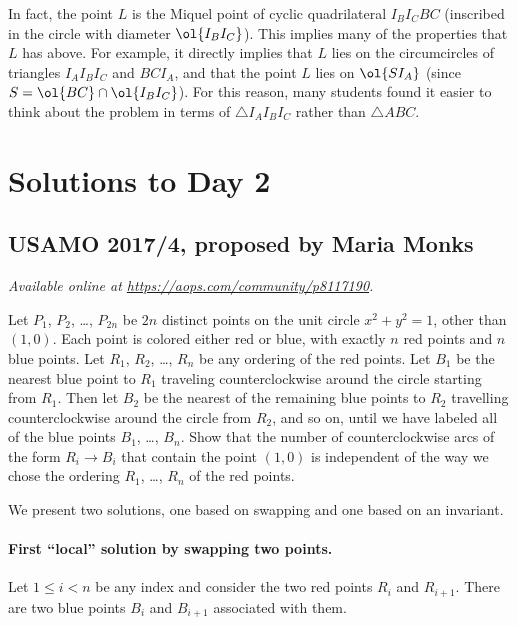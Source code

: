 \documentclass[11pt]{scrartcl}
\begin{document}
\begin{remark*}
  In fact, the point $L$ is the Miquel point of cyclic quadrilateral
  $I_B I_C B C$ (inscribed in the circle with diameter $\ol{I_B I_C}$).
  This implies many of the properties that $L$ has above.
  For example, it directly implies that $L$ lies on the circumcircles
  of triangles $I_A I_B I_C$ and $BCI_A$,
  and that the point $L$ lies on $\ol{SI_A}$
  (since $S = \ol{BC} \cap \ol{I_B I_C}$).
  For this reason, many students found it easier to think about
  the problem in terms of $\triangle I_A I_B I_C$ rather than $\triangle ABC$.
\end{remark*}
\pagebreak

\section{Solutions to Day 2}
\subsection{USAMO 2017/4, proposed by Maria Monks}
\textsl{Available online at \url{https://aops.com/community/p8117190}.}
\begin{mdframed}[style=mdpurplebox,frametitle={Problem statement}]
Let $P_1$, $P_2$, \dots, $P_{2n}$ be $2n$ distinct points on the
unit circle $x^2+y^2=1$, other than $(1,0)$.
Each point is colored either red or blue,
with exactly $n$ red points and $n$ blue points.
Let $R_1$, $R_2$, \dots, $R_n$ be any ordering of the red points.
Let $B_1$ be the nearest blue point to $R_1$ traveling
counterclockwise around the circle starting from $R_1$.
Then let $B_2$ be the nearest of the remaining blue points to $R_2$
travelling counterclockwise around the circle from $R_2$, and so on,
until we have labeled all of the blue points $B_1$, \dots, $B_n$.
Show that the number of counterclockwise arcs of the form $R_i \to B_i$
that contain the point $(1,0)$ is independent of the way we chose the
ordering $R_1$, \dots, $R_n$ of the red points.
\end{mdframed}
We present two solutions, one based on
swapping and one based on an invariant.

\paragraph{First ``local'' solution by swapping two points.}
Let $1 \le i < n$ be any index and consider the two red points
$R_i$ and $R_{i+1}$.
There are two blue points $B_i$ and $B_{i+1}$ associated with them.
\end{document}
